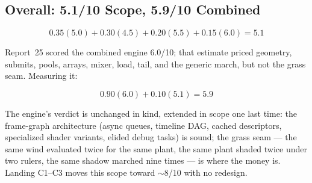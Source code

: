 \documentclass[11pt,a4paper]{article}
\begin{document}
\subsection{Overall: 5.1/10 Scope, 5.9/10 Combined}

\begin{equation}
0.35(5.0) + 0.30(4.5) + 0.20(5.5) + 0.15(6.0) = \mathbf{5.1}
\end{equation}

Report~25 scored the combined engine 6.0/10; that estimate priced geometry,
submits, pools, arrays, mixer, load, tail, and the generic march, but not
the grass seam. Measuring it:

\begin{equation}
0.90(6.0) + 0.10(5.1) = \mathbf{5.9}
\end{equation}

The engine's verdict is unchanged in kind, extended in scope one last time:
the frame-graph architecture (async queues, timeline DAG, cached
descriptors, specialized shader variants, elided debug tasks) is sound; the
grass seam --- the same wind evaluated twice for the same plant, the same
plant shaded twice under two rulers, the same shadow marched nine times ---
is where the money is. Landing C1--C3 moves this scope toward $\sim$8/10
with no redesign.
\end{document}
